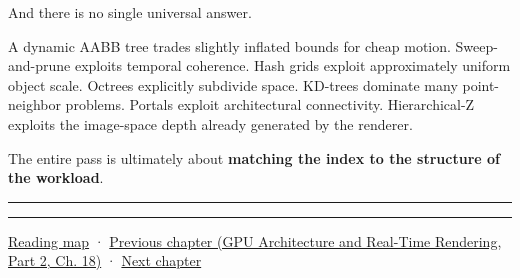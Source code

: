 And there is no single universal answer.

A dynamic AABB tree trades slightly inflated bounds for cheap motion. Sweep-and-prune exploits temporal coherence. Hash grids exploit approximately uniform object scale. Octrees explicitly subdivide space. KD-trees dominate many point-neighbor problems. Portals exploit architectural connectivity. Hierarchical-Z exploits the image-space depth already generated by the renderer.

The entire pass is ultimately about \textbf{matching the index to the structure of the workload}.

\begin{center}\rule{0.5\linewidth}{0.5pt}\end{center}

\begin{center}\rule{0.5\linewidth}{0.5pt}\end{center}

\hyperref[volume-reading-map]{Reading map} · \href{../06-GPU-Architecture-and-Real-Time-Rendering-P02/main.pdf\#06-engine-ii-ch027-preparing-and-publishing-runtime-content}{Previous chapter (GPU Architecture and Real-Time Rendering, Part 2, Ch. 18)} · \hyperref[06-engine-ii-ch029-dynamic-spatial-indices-for-moving-worlds]{Next chapter}
